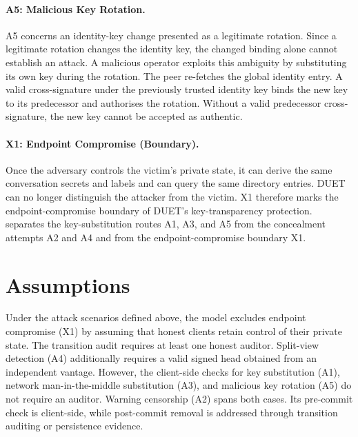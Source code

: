 \label{sc:threat-a5}\paragraph{A5: Malicious Key Rotation.} A5 concerns an identity-key
change presented as a legitimate rotation. Since a legitimate rotation changes the identity key,
the changed binding alone cannot establish an attack. A malicious operator exploits this ambiguity
by substituting its own key during the rotation. The peer re-fetches the global identity
entry. A valid cross-signature under the previously trusted identity key binds the new key to its
predecessor and authorises the rotation. Without a valid predecessor cross-signature, the new key
cannot be accepted as authentic.

\label{sc:threat-x1}\paragraph{X1: Endpoint Compromise (Boundary).} Once the adversary
controls the victim's private state, it can derive the same conversation secrets and labels and can
query the same directory entries. DUET can no longer distinguish the attacker from the victim. X1
therefore marks the endpoint-compromise boundary of DUET's key-transparency protection.
 separates the key-substitution routes A1, A3, and A5 from the
concealment attempts A2 and A4 and from the endpoint-compromise boundary X1.

\section{Assumptions}\label{sec:threat-assumptions}

Under the attack scenarios defined above, the model excludes endpoint compromise (X1) by assuming
that honest clients retain control of their private state. The transition audit requires at least
one honest auditor. Split-view detection (A4) additionally requires a valid signed head obtained from
an independent vantage. However, the client-side checks for key substitution (A1), network
man-in-the-middle substitution (A3), and malicious key rotation (A5) do not require an auditor.
Warning censorship (A2) spans both cases. Its pre-commit check is client-side, while post-commit
removal is addressed through transition auditing or persistence evidence.

